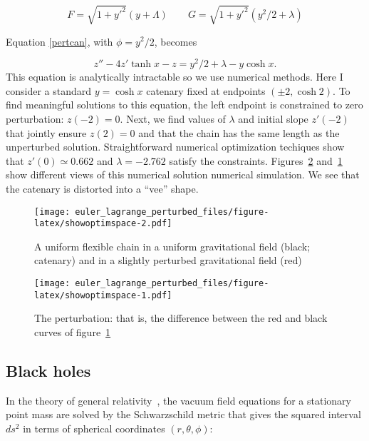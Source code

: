 \documentclass[pdflatex,sn-mathphys-num]{sn-jnl}%
\theoremstyle{thmstyleone}%
\theoremstyle{thmstyletwo}%
\theoremstyle{thmstylethree}%
\begin{document}
\begin{equation}
  F = \sqrt{1+y'^2}(y+\Lambda)\qquad
  G = \sqrt{1+y'^2}(y^2/2 + \lambda)
\end{equation}

Equation \ref{pertcan}, with $\phi=y^2/2$, becomes

\begin{equation}
  z'' - 4z'\tanh x - z = y^2/2 + \lambda -y\cosh x.
\end{equation}
%
This equation is analytically intractable so we use numerical methods.
Here I consider a standard $y=\cosh x$ catenary fixed at endpoints
$(\pm 2, \cosh 2)$.  To find meaningful solutions to this equation,
the left endpoint is constrained to zero perturbation: $z(-2)=0$.
Next, we find values of $\lambda$ and initial slope $z'(-2)$ that
jointly ensure $z(2)=0$ and that the chain has the same length as the
unperturbed solution.  Straightforward numerical optimization
techiques show that $z'(0)\simeq 0.662$ and $\lambda = -2.762$ satisfy
the constraints.  Figures~\ref{trop} and~\ref{trop_perturb} show
different views of this numerical solution numerical simulation.  We
see that the catenary is distorted into a ``vee'' shape.

\begin{figure}[h]
\centering %
\texttt{[image: euler\_lagrange\_perturbed\_files/figure-latex/showoptimspace-2.pdf]}
\caption{A uniform flexible chain in a uniform gravitational field
  (black; catenary) and in a slightly perturbed gravitational field (red)}
\label{trop_perturb}
\end{figure}

\begin{figure}[h]
\centering %
\texttt{[image: euler\_lagrange\_perturbed\_files/figure-latex/showoptimspace-1.pdf]}
\caption{The perturbation: that is, the difference between the red and
  black curves of figure~\ref{trop_perturb}}
\label{trop}
\end{figure}

\subsection{Black holes}

In the theory of general relativity~\cite{misner1973}, the vacuum
field equations for a stationary point mass are solved by the
Schwarzschild metric that gives the squared interval $ds^2$ in terms
of spherical coordinates $(r,\theta,\phi)$:
\end{document}
